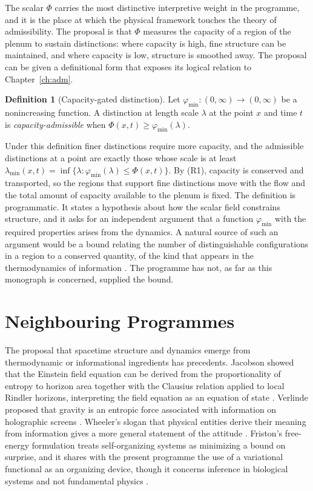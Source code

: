\documentclass[11pt,twoside,openright]{book}
\theoremstyle{plain}
\theoremstyle{definition}
\newtheorem{definition}[theorem]{Definition}
\theoremstyle{remark}
\begin{document}
The scalar $\Phi$ carries the most distinctive interpretive weight in the programme, and it is the place at which the physical framework touches the theory of admissibility. The proposal is that $\Phi$ measures the capacity of a region of the plenum to sustain distinctions: where capacity is high, fine structure can be maintained, and where capacity is low, structure is smoothed away. The proposal can be given a definitional form that exposes its logical relation to Chapter~\ref{ch:adm}.

\begin{definition}[Capacity-gated distinction]\label{def:gated}
Let $\varphi_{\min}:(0,\infty)\to(0,\infty)$ be a nonincreasing function. A distinction at length scale $\lambda$ at the point $x$ and time $t$ is \emph{capacity-admissible} when $\Phi(x,t)\ge\varphi_{\min}(\lambda)$.
\end{definition}

Under this definition finer distinctions require more capacity, and the admissible distinctions at a point are exactly those whose scale is at least $\lambda_{\min}(x,t)=\inf\{\lambda:\varphi_{\min}(\lambda)\le\Phi(x,t)\}$. By (R1), capacity is conserved and transported, so the regions that support fine distinctions move with the flow and the total amount of capacity available to the plenum is fixed. The definition is programmatic. It states a hypothesis about how the scalar field constrains structure, and it asks for an independent argument that a function $\varphi_{\min}$ with the required properties arises from the dynamics. A natural source of such an argument would be a bound relating the number of distinguishable configurations in a region to a conserved quantity, of the kind that appears in the thermodynamics of information \cite{jaynes1957}. The programme has not, as far as this monograph is concerned, supplied the bound.

\section{Neighbouring Programmes}

The proposal that spacetime structure and dynamics emerge from thermodynamic or informational ingredients has precedents. Jacobson showed that the Einstein field equation can be derived from the proportionality of entropy to horizon area together with the Clausius relation applied to local Rindler horizons, interpreting the field equation as an equation of state \cite{jacobson1995}. Verlinde proposed that gravity is an entropic force associated with information on holographic screens \cite{verlinde2011}. Wheeler's slogan that physical entities derive their meaning from information gives a more general statement of the attitude \cite{wheeler1990}. Friston's free-energy formulation treats self-organizing systems as minimizing a bound on surprise, and it shares with the present programme the use of a variational functional as an organizing device, though it concerns inference in biological systems and not fundamental physics \cite{friston2010}.
\end{document}
